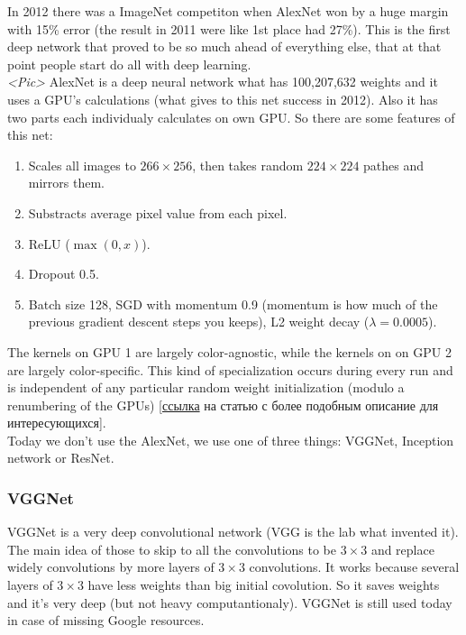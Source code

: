 In 2012 there was a ImageNet competiton when AlexNet won by a huge margin with 15\% error (the result in 2011 were like 1st place had 27\%). This is the first deep network that proved to be so much ahead of everything else, that at that point people start do all with deep learning.\\
{\it <Pic>}
AlexNet is a deep neural network what has 100,207,632 weights and it uses a GPU's calculations (what gives to this net success in 2012). Also it has two parts each individualy calculates on own GPU. So there are some features of this net:
\begin{enumerate}[label=$\bullet$]
  \item Scales all images to $266\times256$, then takes random $224\times224$ pathes and mirrors them.
  \item Substracts average pixel value from each pixel.
  \item ReLU ($\max(0,x)$).
  \item Dropout 0.5.
  \item Batch size 128, SGD with momentum 0.9 (momentum is how much of the previous gradient descent steps you keeps), L2 weight decay ($\lambda=0.0005$).
\end{enumerate}
The kernels on GPU 1 are largely color-agnostic, while the kernels on on GPU 2 are largely color-specific. This kind of specialization occurs during every run and is independent of any particular random weight initialization (modulo a renumbering of the GPUs) [\href{https://www.nvidia.cn/content/tesla/pdf/machine-learning/imagenet-classification-with-deep-convolutional-nn.pdf}{ссылка} на статью с более подобным описание для интересующихся].\\
Today we don't use the AlexNet, we use one of three things: VGGNet, Inception network or ResNet.

\subsubsection*{VGGNet}

VGGNet is a very deep convolutional network (VGG is the lab what invented it). The main idea of those to skip to all the convolutions to be $3\times3$ and replace widely convolutions by more layers of $3\times3$ convolutions. It works because several layers of $3\times3$ have less weights than big initial covolution. So it saves weights and it's very deep (but not heavy computantionaly). VGGNet is still used today in case of missing Google resources.


